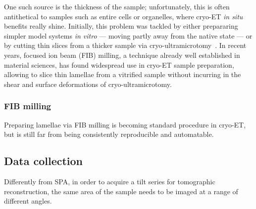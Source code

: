 One such source is the thickness of the sample; unfortunately, this is often antithetical to samples such as entire cells or organelles, where cryo-ET \textit{in situ} benefits really shine.
Initially, this problem was tackled by either prepararing simpler model systems \textit{in vitro} --- moving partly away from the native state --- or by cutting thin slices from a thicker sample via cryo-ultramicrotomy~\cite{peaseElectronMicroscopyUltramicrotomy1981}.
In recent years, focused ion beam (FIB) milling, a technique already well established in material sciences, has found widespread use in cryo-ET sample preparation, allowing to slice thin lamellae from a vitrified sample without incurring in the shear and surface deformations of cryo-ultramicrotomy.

\subsubsection{FIB milling}
Preparing lamellae via FIB milling is becoming standard procedure in cryo-ET, but is still far from being consistently reproducible and automatable.

\subsection{Data collection}\label{et_data_collection}
Differently from SPA, in order to acquire a tilt series for tomographic reconstruction, the same area of the sample needs to be imaged at a range of different angles.

\newpage

\FloatBarrier

